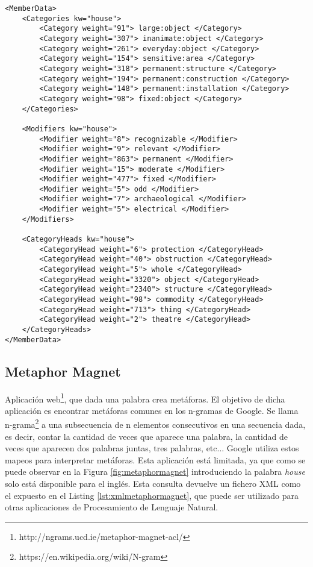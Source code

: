 \lstset{language=XML}
\begin{lstlisting}[caption= Ejemplo formatos XML Thesaurus Rex, label={lst:xmlthesaurusrex}, frame=single]
<MemberData>
	<Categories kw="house">
		<Category weight="91"> large:object </Category>
		<Category weight="307"> inanimate:object </Category>
		<Category weight="261"> everyday:object </Category>
		<Category weight="154"> sensitive:area </Category>
		<Category weight="318"> permanent:structure </Category>
		<Category weight="194"> permanent:construction </Category>
		<Category weight="148"> permanent:installation </Category>
		<Category weight="98"> fixed:object </Category>
	</Categories>
	
	<Modifiers kw="house">
		<Modifier weight="8"> recognizable </Modifier>
		<Modifier weight="9"> relevant </Modifier>
		<Modifier weight="863"> permanent </Modifier>
		<Modifier weight="15"> moderate </Modifier>
		<Modifier weight="477"> fixed </Modifier>
		<Modifier weight="5"> odd </Modifier>
		<Modifier weight="7"> archaeological </Modifier>
		<Modifier weight="5"> electrical </Modifier>
	</Modifiers>
	
	<CategoryHeads kw="house">
		<CategoryHead weight="6"> protection </CategoryHead>
		<CategoryHead weight="40"> obstruction </CategoryHead>
		<CategoryHead weight="5"> whole </CategoryHead>
		<CategoryHead weight="3320"> object </CategoryHead>
		<CategoryHead weight="2340"> structure </CategoryHead>
		<CategoryHead weight="98"> commodity </CategoryHead>
		<CategoryHead weight="713"> thing </CategoryHead>
		<CategoryHead weight="2"> theatre </CategoryHead>
	</CategoryHeads>
</MemberData>

\end{lstlisting}



\subsection{Metaphor Magnet}
\label{cap:subsec:metaphormagnet}
Aplicación web\footnote{http://ngrams.ucd.ie/metaphor-magnet-acl/}, que dada una palabra crea metáforas. El objetivo \citep{VealeT2012} de dicha aplicación es encontrar metáforas comunes en los n-gramas de Google. Se llama n-grama\footnote{https://en.wikipedia.org/wiki/N-gram} a una subsecuencia de n elementos consecutivos en una secuencia dada, es decir, contar la cantidad de veces que aparece una palabra, la cantidad de veces que aparecen dos palabras juntas, tres palabras, etc... Google utiliza estos mapeos para interpretar metáforas. Esta aplicación está limitada, ya que como se puede observar en la Figura \ref{fig:metaphormagnet} introduciendo la palabra \textit{house} solo está disponible para el inglés.
Esta consulta devuelve un fichero XML como el expuesto en el Listing \ref{lst:xmlmetaphormagnet}, que puede ser utilizado para otras aplicaciones de Procesamiento de Lenguaje Natural.


